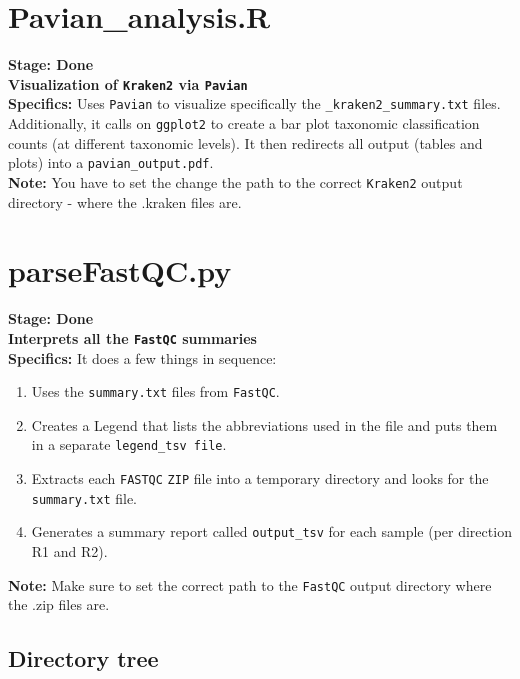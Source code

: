 \documentclass[11pt]{report}
\begin{document}
{\linenumbers*
\section{Pavian\_analysis.R}
\textbf{Stage: Done} \\   
\textbf{Visualization of \texttt{Kraken2} via \texttt{Pavian}} \\
\textbf{Specifics:} Uses \texttt{Pavian} to visualize specifically the \texttt{\_kraken2\_summary.txt} files. Additionally, it calls on \texttt{ggplot2} to create a bar plot taxonomic classification counts (at different taxonomic levels). It then redirects all output (tables and plots) into a \texttt{pavian\_output.pdf}. \\
\textbf{Note:} You have to set the change the path to the correct \texttt{Kraken2} output directory - where the .kraken files are. 

\linenumbers*
\section{parseFastQC.py}
\textbf{Stage: Done} \\   
\textbf{Interprets all the \texttt{FastQC} summaries} \\
\textbf{Specifics:} It does a few things in sequence:
\begin{enumerate}
	\item Uses the \texttt{summary.txt} files from \texttt{FastQC}. 
	\item Creates a Legend that lists the abbreviations used in the file and puts them in a separate \texttt{legend\_tsv file}. 
	\item Extracts each \texttt{FASTQC} \texttt{ZIP} file into a temporary directory and looks for the \texttt{summary.txt} file.
	\item Generates a summary report called \texttt{output\_tsv} for each sample (per direction R1 and R2). 
\end{enumerate}
\textbf{Note:} Make sure to set the correct path to the \texttt{FastQC} output directory where the .zip files are. 

\subsection{Directory tree}


}
\end{document}
